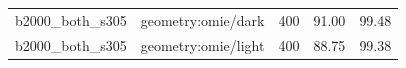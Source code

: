 \begin{longtable}{l>{\raggedright\arraybackslash}p{.42\linewidth}rrr}
b2000\_\allowbreak{}both\_\allowbreak{}s305 & %
geometry:omie/dark & %
400 & %
91.00 & %
99.48 \\ %

b2000\_\allowbreak{}both\_\allowbreak{}s305 & %
geometry:omie/light & %
400 & %
88.75 & %
99.38 \\ %


\end{longtable}
